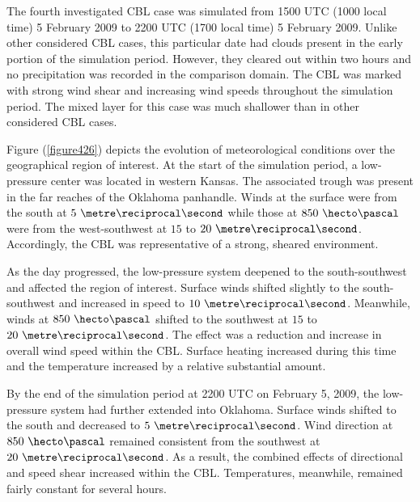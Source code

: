 The fourth investigated CBL case was simulated from 1500 UTC (1000 local time) 5 February 2009 to 2200 UTC (1700 local time) 5 February 2009. Unlike other considered CBL cases, this particular date had clouds present in the early portion of the simulation period. However, they cleared out within two hours and no precipitation was recorded in the comparison domain. The CBL was marked with strong wind shear and increasing wind speeds throughout the simulation period. The mixed layer for this case was much shallower than in other considered CBL cases. 

Figure (\autoref{figure426}) depicts the evolution of meteorological conditions over the geographical region of interest. At the start of the simulation period, a low-pressure center was located in western Kansas. The associated trough was present in the far reaches of the Oklahoma panhandle. Winds at the surface were from the south at $5\mbox{ }\metre\reciprocal\second$ while those at $850\mbox{ }\hecto\pascal$ were from the west-southwest at $15$ to $20\mbox{ }\metre\reciprocal\second$. Accordingly, the CBL was representative of a strong, sheared environment. 

As the day progressed, the low-pressure system deepened to the south-southwest and affected the region of interest. Surface winds shifted slightly to the south-southwest and increased in speed to $10\mbox{ }\metre\reciprocal\second$. Meanwhile, winds at $850\mbox{ }\hecto\pascal$ shifted to the southwest at $15$ to $20\mbox{ }\metre\reciprocal\second$. The effect was a reduction and increase in overall wind speed within the CBL. Surface heating increased during this time and the temperature increased by a relative substantial amount. 

By the end of the simulation period at 2200 UTC on February 5, 2009, the low-pressure system had further extended into Oklahoma. Surface winds shifted to the south and decreased to $5\mbox{ }\metre\reciprocal\second$. Wind direction at $850\mbox{ }\hecto\pascal$ remained consistent from the southwest at $20\mbox{ }\metre\reciprocal\second$. As a result, the combined effects of directional and speed shear increased within the CBL. Temperatures, meanwhile, remained fairly constant for several hours.

